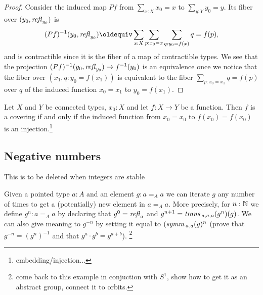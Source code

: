 {\begin{proof}
Consider the induced map $Pf$ from $\sum_{x:X}x_0=x$ to $\sum_{y:Y}y_0=y$.  Its fiber over $(y_0,\mathop{{\it refl}_{y_0}})$ is 
$$(Pf)^{-1}(y_0,\refl{y_0})\oldequiv\sum_{x:X}\sum_{p:x_0=x}\sum_{q:y_0=f(x)}q=f(p),$$ and is contractible since it is the fiber of a map of contractible types.  We see that the projection $(Pf)^{-1}(y_0,\mathop{{\it refl}_{y_0}})\to f^{-1}(y_0)$ is an equivalence once we notice that the fiber over $(x_1,q:y_0=f(x_1)) $ is equivalent to the fiber $\sum_{p:x_0=x_1}q=f(p)$ over $q$ of the induced function $x_0=x_1$ to $y_0=f(x_1)$.
\end{proof}
\begin{lemma}
  Let $X$ and $Y$ be connected types, $x_0:X$ and let $f:X\to Y$ be a function.  Then $f$ is a covering if and only if the induced function from $x_0=x_0$ to $f(x_0)=f(x_0)$ is an injection.\footnote{embedding/injection...}
\end{lemma}



\subsection{Negative numbers}
This is to be deleted when integers are stable

 \begin{example}%
   Given a pointed type $a:A$ and an element $g: a=_Aa$ we can iterate $g$ any number of times to get a (potentially) new element in $a=_Aa$. More precisely, for $n:\mathbb{N}$ we define $g^n:a=_Aa$ by declaring that $g^0=\mathop{{\it refl}_{a}}$ and $g^{n+1}=\mathop{\mathit{trans}}{}_{a,a,a}(g^n)(g)$.  We can also give meaning to $g^{-n}$ by setting it equal to $(\mathop{\mathit{symm}}{}_{a,a}(g)^n$ (prove that $g^{-n}=(g^n)^{-1}$ and that $g^a\cdot g^b=g^{a+b}$).  \footnote{come back to this example in conjuction with $S^1$, show how to get it as an abstract group, connect it to orbits.}


\end{example}}
